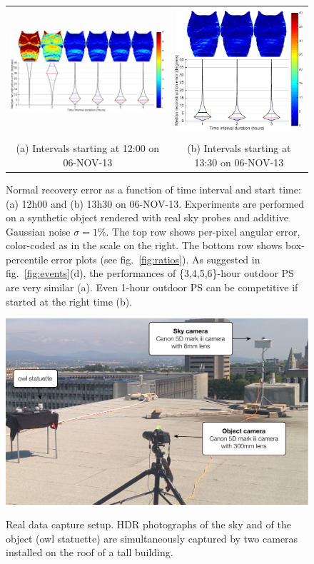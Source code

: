\begin{figure}[t]
    \centering
    \footnotesize
    \begin{tabular}{cc}
        \includegraphics[height=4.7cm]{./figures/owl/owl-12h.pdf} & 
        \includegraphics[height=4.7cm]{./figures/owl/owl-13h30.pdf} \\
        (a) Intervals starting at 12:00 on 06-NOV-13 & (b) Intervals starting at 13:30 on 06-NOV-13
    \end{tabular}
    \vspace{1mm}
    \caption[Normal recovery error as a function of time interval and start time]{Normal recovery error as a function of time interval and start time: (a) 12h00 and (b) 13h30 on 06-NOV-13. Experiments are performed on a synthetic object rendered with real sky probes and additive Gaussian noise $\sigma=1\%$. The top row shows per-pixel angular error, color-coded as in the scale on the right. The bottom row shows box-percentile error plots (see fig.~\ref{fig:ratios}). As suggested in fig.~\ref{fig:events}(d), the performances of \{3,4,5,6\}-hour outdoor PS are very similar (a). Even 1-hour outdoor PS can be competitive if started at the right time (b).}
    \label{fig:owl-results}
\end{figure}

\begin{figure}[!t]
    \centering
    \includegraphics[width=.52\linewidth]{./figures/realData/realData-setup.pdf} \\[1mm]
    \caption[Real data capture setup]{Real data capture setup. HDR photographs of the sky and of the object (owl statuette) are simultaneously captured by two cameras installed on the roof of a tall building.}
    \label{fig:real-data-setup}
\end{figure}

